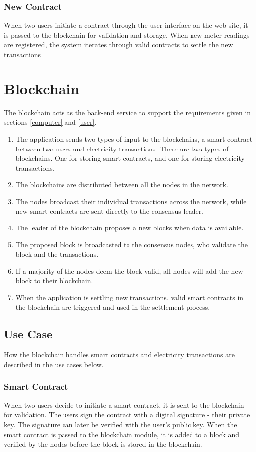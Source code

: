 \subsubsection*{New Contract}
When two users initiate a contract through the user interface on the web site, it is passed to the blockchain for validation and storage. When new meter readings are registered, the system iterates through valid contracts to settle the new transactions

\section{Blockchain} \label{blockspec}
The blockchain acts as the back-end service to support the requirements given in sections \ref{computer} and \ref{user}.
\begin{enumerate}
\item The application sends two types of input to the blockchains, a smart contract between two users and electricity transactions. There are two types of blockchains. One for storing smart contracts, and one for storing electricity transactions.
\item The blockchains are distributed between all the nodes in the network. 
\item The nodes broadcast their individual transactions across the network, while new smart contracts are sent directly to the consensus leader.
\item The leader of the blockchain proposes a new blocks when data is available.
\item The proposed block is broadcasted to the consensus nodes, who validate the block and the transactions.
\item If a majority of the nodes deem the block valid, all nodes will add the new block to their blockchain.
\item When the application is settling new transactions, valid smart contracts in the blockchain are triggered and used in the settlement process. 
\end{enumerate}

\subsection{Use Case}
How the blockchain handles smart contracts and electricity transactions are described in the use cases below.
\subsubsection*{Smart Contract}
When two users decide to initiate a smart contract, it is sent to the blockchain for validation. The users sign the contract with a digital signature - their private key. The signature can later be verified with the user's public key.
When the smart contract is passed to the blockchain module, it is added to a block and verified by the nodes before the block is stored in the blockchain.
 
